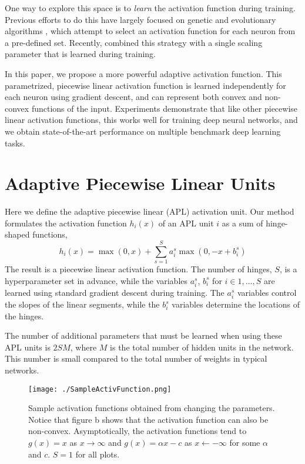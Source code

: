 \documentclass{article} \usepackage{iclr2015,times}
\begin{document}
One way to explore this space is to \emph{learn} the activation function during training. Previous efforts to do this have largely focused on genetic and evolutionary algorithms \citep{yao1999evolving}, which attempt to select an activation function for each neuron from a pre-defined set. Recently, \citet{turner2014neuroevolution} combined this strategy with a single scaling parameter that is learned during training.

In this paper, we propose a more powerful adaptive activation function. This parametrized, piecewise linear activation function is learned independently for each neuron using gradient descent, and can represent both convex and non-convex functions of the input. Experiments demonstrate that like other piecewise linear activation functions, this works well for training deep neural networks, and we obtain state-of-the-art performance on multiple benchmark deep learning tasks.


 


\section{Adaptive Piecewise Linear Units}
\label{sec:learnedfunctions}



Here we define the adaptive piecewise linear (APL) activation unit. Our method formulates the activation function $h_i(x)$ of an APL unit $i$ as a sum of hinge-shaped functions,
\begin{equation}
h_i(x) = \max(0,x) + \sum_{s=1}^{S}a_{i}^{s}\max(0,-x+b_{i}^{s})
\label{eq:learnedActiv}
\end{equation}
The result is a piecewise linear activation function. The number of hinges, $S$, is a hyperparameter set in advance, while the variables $a^s_i$, $b^s_i$  for $i\in{1,...,S}$ are learned using standard gradient descent during training. The   $a_i^s$ variables control the slopes of the linear segments, while the $b_i^s$ variables determine the locations of the hinges.

The number of additional parameters that must be learned when using these APL units is $2SM$, where $M$ is the total number of hidden units in the network. This number is small compared to the total number of weights in typical networks.

\begin{wrapfigure}{r}{0.5\textwidth}
\center
\vspace{-0.5in}
\texttt{[image: ./SampleActivFunction.png]}
\caption{Sample activation functions obtained from changing the parameters. Notice that figure b shows that the activation function can also be non-convex.
Asymptotically, the activation functions tend to $g(x)=x$ as $x\rightarrow\infty$ and $g(x)=\alpha x - c$ as $x\leftarrow -\infty$ for some $\alpha$ and $c$.
$S=1$ for all plots.
\vspace{-0.5in}
}
\label{fig:SampleActivFunction}
\end{wrapfigure}
\end{document}
